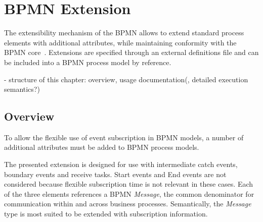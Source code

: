 \section{BPMN Extension}\label{ch:bpmnx}


The extensibility mechanism of the \ac{BPMN} allows to extend standard process elements with additional attributes, while maintaining conformity with the BPMN core~\cite[p.\,44]{bpmnspec}.
Extensions are specified through an external definitions file and can be included into a BPMN process model by reference.


- structure of this chapter: overview, usage documentation(, detailed execution semantics?)

\subsection{Overview}

To allow the flexible use of event subscription in BPMN models, a number of additional attributes must be added to BPMN process models.

The presented extension is designed for use with intermediate catch events, boundary events and receive tasks. Start events and End events are not considered because flexible subscription time is not relevant in these cases.
Each of the three elements references a BPMN \textit{Message}, the common denominator for communication within and across business processes.
Semantically, the \textit{Message} type is most suited to be extended with subscription information.





